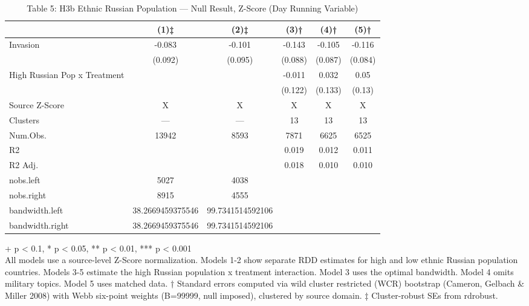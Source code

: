 \begin{table}[t]
\caption{\label{tab:table-05b}Table 5: H3b Ethnic Russian Population — Null Result, Z-Score (Day Running Variable)} 
\fontsize{12.0pt}{14.0pt}\selectfont
\begin{tabular*}{\linewidth}{@{\extracolsep{\fill}}lccccc}
\toprule
  & (1)‡ & (2)‡ & (3)† & (4)† & (5)† \\ 
\midrule\addlinespace[2.5pt]
Invasion & -0.083 & -0.101 & -0.143 & -0.105 & -0.116 \\ 
 & (0.092) & (0.095) & (0.088) & (0.087) & (0.084) \\ 
High Russian Pop x Treatment &  &  & -0.011 & 0.032 & 0.05 \\ 
{} & {} & {} & {(0.122)} & {(0.133)} & {(0.13)} \\ 
Source Z-Score & X & X & X & X & X \\ 
Clusters & — & — & 13 & 13 & 13 \\ 
Num.Obs. & 13942 & 8593 & 7871 & 6625 & 6525 \\ 
R2 &  &  & 0.019 & 0.012 & 0.011 \\ 
R2 Adj. &  &  & 0.018 & 0.010 & 0.010 \\ 
nobs.left & 5027 & 4038 &  &  &  \\ 
nobs.right & 8915 & 4555 &  &  &  \\ 
bandwidth.left & 38.2669459375546 & 99.7341514592106 &  &  &  \\ 
bandwidth.right & 38.2669459375546 & 99.7341514592106 &  &  &  \\ 
\bottomrule
\end{tabular*}
\begin{minipage}{\linewidth}
\vspace{.05em}
+ p < 0.1, * p < 0.05, ** p < 0.01, *** p < 0.001\\
All models use a source-level Z-Score normalization. Models 1-2 show separate
RDD estimates for high and low ethnic Russian population countries. Models 3-5
estimate the high Russian population x treatment interaction. Model 3 uses the
optimal bandwidth. Model 4 omits military topics. Model 5 uses matched data. †
Standard errors computed via wild cluster restricted (WCR) bootstrap (Cameron,
Gelbach \& Miller 2008) with Webb six-point weights (B=99999, null imposed),
clustered by source domain. ‡ Cluster-robust SEs from rdrobust.\\
\end{minipage}
\end{table}

